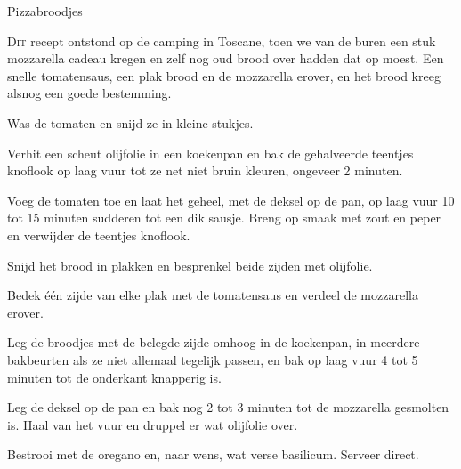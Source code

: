 \begin{recipe}{Pizzabroodjes}


\lettrine{D}{it} recept ontstond op de camping in Toscane, toen we van de
buren een stuk mozzarella cadeau kregen en zelf nog oud brood over hadden dat
op moest. Een snelle tomatensaus, een plak brood en de mozzarella erover, en
het brood kreeg alsnog een goede bestemming.

\begin{ingredients}
\end{ingredients}

\begin{steps}
  \item Was de tomaten en snijd ze in kleine stukjes.
  \item Verhit een scheut olijfolie in een koekenpan en bak de gehalveerde
        teentjes knoflook op laag vuur tot ze net niet bruin kleuren, ongeveer
        2 minuten.
  \item Voeg de tomaten toe en laat het geheel, met de deksel op de
        pan, op laag vuur 10 tot 15 minuten sudderen tot een dik sausje. Breng
        op smaak met zout en peper en verwijder de teentjes knoflook.
  \item Snijd het brood in plakken en besprenkel beide zijden met olijfolie.
  \item Bedek één zijde van elke plak met de tomatensaus en verdeel de
        mozzarella erover.
  \item Leg de broodjes met de belegde zijde omhoog in de koekenpan, in
        meerdere bakbeurten als ze niet allemaal tegelijk passen, en bak op
        laag vuur 4 tot 5 minuten tot de onderkant knapperig is.
  \item Leg de deksel op de pan en bak nog 2 tot 3 minuten tot de mozzarella
        gesmolten is. Haal van het vuur en druppel er wat olijfolie over.
  \item Bestrooi met de oregano en, naar wens, wat verse basilicum. Serveer
        direct.
\end{steps}

\end{recipe}
